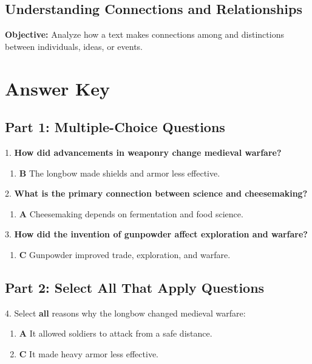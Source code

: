 \documentclass[12pt]{article}
\begin{document}
\subsection*{Understanding Connections and Relationships}
\onehalfspacing

\begin{tcolorbox}[colframe=black!40, colback=gray!0, title=Learning Objective]
\textbf{Objective:} Analyze how a text makes connections among and distinctions between individuals, ideas, or events.
\end{tcolorbox}


\section*{Answer Key}

\subsection*{Part 1: Multiple-Choice Questions}

1. \textbf{How did advancements in weaponry change medieval warfare?}
\begin{enumerate}[label=\Alph*.]
    \item \textbf{B} The longbow made shields and armor less effective.
\end{enumerate}

2. \textbf{What is the primary connection between science and cheesemaking?}
\begin{enumerate}[label=\Alph*.]
    \item \textbf{A} Cheesemaking depends on fermentation and food science.
\end{enumerate}

3. \textbf{How did the invention of gunpowder affect exploration and warfare?}
\begin{enumerate}[label=\Alph*.]
    \item \textbf{C} Gunpowder improved trade, exploration, and warfare.
\end{enumerate}

\subsection*{Part 2: Select All That Apply Questions}

4. Select \textbf{all} reasons why the longbow changed medieval warfare:
\begin{enumerate}[label=\Alph*.]
    \item \textbf{A} It allowed soldiers to attack from a safe distance.
    \item \textbf{C} It made heavy armor less effective.
\end{enumerate}
\end{document}
